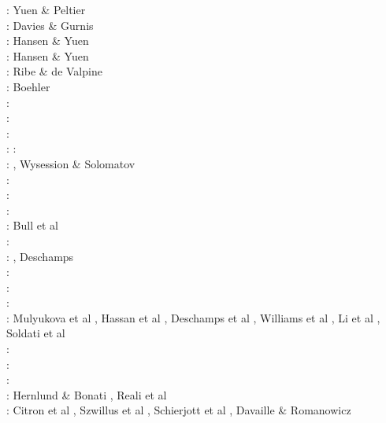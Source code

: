 \begin{scriptsize}
\nineteeneighty: Yuen \& Peltier \cite{yupe80}\\
\nineteeneightysix: Davies \& Gurnis \cite{dagu86}\\
\nineteeneightyeight: Hansen \& Yuen \cite{hayu88}\\
\nineteeneightynine: Hansen \& Yuen \cite{hayu89}\\
\nineteenninetyfour: Ribe \& de Valpine \cite{ride94}\\
\nineteenninetysix: Boehler \cite{boeh96}\\
\nineteenninetyseven: \cite{kell97}\\
\nineteenninetyeight: \cite{tack98b}\\
\twothousandone: \cite{soga01}\\
\twothousandtwo: \cite{somo02}\cite{tagh02}
\twothousandfour: \cite{mczh04}\cite{nata04}\\
\twothousandfive: \cite{mczh05a}\cite{nata05}\cite{nata05b}, Wysession \& Solomatov \cite{wyso05}\\
\twothousandsix: \cite{nata06}\\
\twothousandseven: \cite{heta07}\cite{moyu07}\cite{pelt07}\cite{hibl07}\cite{yumc07}\\
\twothousandeight: \cite{gamc08}\cite{nata08}\cite{stho08}\\
\twothousandnine:  Bull et al \cite{bumr09}\\
\twothousandten: \cite{stto10}\cite{mcgr10}\cite{nata10}\cite{vady10}\\
\twothousandeleven: \cite{bowg11}\cite{talz11}\cite{vayj11}, Deschamps \etal \cite{dekt11}\\
\twothousandtwelve: \cite{stto12}\cite{dagd12}\cite{dect12}\\
\twothousandthirteen: \cite{limc13}\cite{bogs13a}\cite{bogs13b}\\
\twothousandfourteen: \cite{budt14}\cite{lidt14}\cite{tovd14}\\
\twothousandfifteen: Mulyukova et al \cite{musd15}, Hassan et al \cite{hafg15}, Deschamps et al \cite{delt15},
                     Williams et al \cite{wilm15}, Li et al \cite{lidt15}, Soldati et al \cite{sobd15}\\
\twothousandsixteen: \cite{dost16}\cite{tosa16}\\
\twothousandseventeen: \cite{hish17}\cite{lizh17}\\
\twothousandeighteen: \cite{daga18}\cite{lizo18}\cite{hect18}\cite{dert18}\\
\twothousandnineteen: Hernlund \& Bonati \cite{hebo19}, Reali et al \cite{rejv19}\\
\twothousandtwenty: Citron et al \cite{cilw20}, Szwillus et al \cite{szes20}, Schierjott et al \cite{scrt20},
                    Davaille \& Romanowicz \cite{daro20}
\end{scriptsize}

